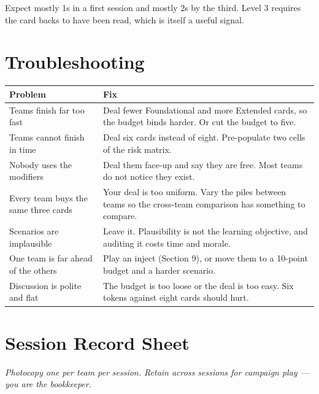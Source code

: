 \documentclass[11pt,letterpaper]{article}
\begin{document}
Expect mostly 1s in a first session and mostly 2s by the third. Level 3 requires
the card backs to have been read, which is itself a useful signal.

\section{Troubleshooting}

\begin{center}
\small
\begin{tabularx}{\textwidth}{@{}p{5cm} X@{}}
\toprule
\textbf{Problem} & \textbf{Fix} \\
\midrule
Teams finish far too fast & Deal fewer Foundational and more Extended cards, so
the budget binds harder. Or cut the budget to five. \\
Teams cannot finish in time & Deal six cards instead of eight. Pre-populate two
cells of the risk matrix. \\
Nobody uses the modifiers & Deal them face-up and say they are free. Most teams
do not notice they exist. \\
Every team buys the same three cards & Your deal is too uniform. Vary the piles
between teams so the cross-team comparison has something to compare. \\
Scenarios are implausible & Leave it. Plausibility is not the learning
objective, and auditing it costs time and morale. \\
One team is far ahead of the others & Play an inject (Section 9), or move them
to a 10-point budget and a harder scenario. \\
Discussion is polite and flat & The budget is too loose or the deal is too easy.
Six tokens against eight cards should hurt. \\
\bottomrule
\end{tabularx}
\end{center}

\newpage
\appendix
\section{Session Record Sheet}

\textit{Photocopy one per team per session. Retain across sessions for campaign
play --- you are the bookkeeper.}
\end{document}
